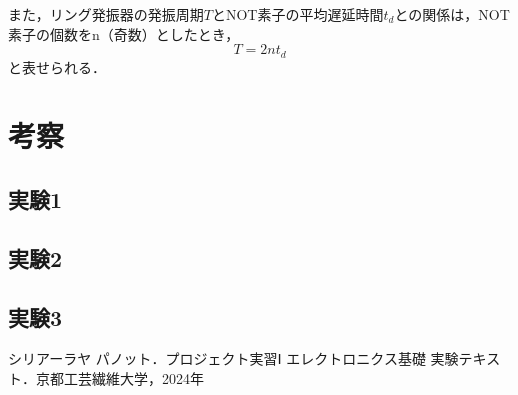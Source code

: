\documentclass{jlreq}
\numberwithin{equation}{section}
\begin{document}
また，リング発振器の発振周期$T$とNOT素子の平均遅延時間$t_d$との関係は，NOT素子の個数をn（奇数）としたとき，
\begin{equation}
  T = 2nt_d
\end{equation}
と表せられる．

\section{考察}
\subsection{実験1}
\subsection{実験2}
\subsection{実験3}

\begin{thebibliography}{9}
  \item シリアーラヤ パノット．プロジェクト実習Ⅰ エレクトロニクス基礎 実験テキスト．京都工芸繊維大学，2024年
\end{thebibliography}
\end{document}
